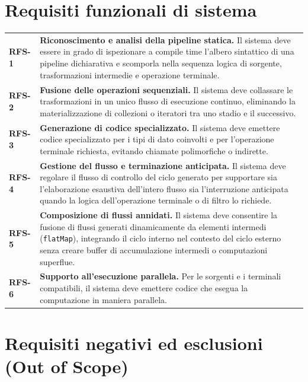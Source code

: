 \documentclass[a4paper,11pt]{report}
\theoremstyle{definition}
\begin{document}
\section{Requisiti funzionali di sistema}

\begin{longtable}{@{}p{}p{}@{}}
  \textbf{RFS-1} &
  \textbf{Riconoscimento e analisi della pipeline statica.}
  Il sistema deve essere in grado di ispezionare a compile time l'albero sintattico di una pipeline dichiarativa e scomporla nella sequenza logica di sorgente, trasformazioni intermedie e operazione terminale.
  \\[0.5em]

  \textbf{RFS-2} &
  \textbf{Fusione delle operazioni sequenziali.}
  Il sistema deve collassare le trasformazioni in un unico flusso di esecuzione continuo, eliminando la materializzazione di collezioni o iteratori tra uno stadio e il successivo.
  \\[0.5em]

  \textbf{RFS-3} &
  \textbf{Generazione di codice specializzato.}
  Il sistema deve emettere codice specializzato per i tipi di dato coinvolti e per l'operazione terminale richiesta, evitando chiamate polimorfiche o indirette.
  \\[0.5em]

  \textbf{RFS-4} &
  \textbf{Gestione del flusso e terminazione anticipata.}
  Il sistema deve regolare il flusso di controllo del ciclo generato per supportare sia l'elaborazione esaustiva dell'intero flusso sia l'interruzione anticipata quando la logica dell'operazione terminale o di filtro lo richiede.
  \\[0.5em]

  \textbf{RFS-5} &
  \textbf{Composizione di flussi annidati.}
  Il sistema deve consentire la fusione di flussi generati dinamicamente da elementi intermedi (\texttt{flatMap}), integrando il ciclo interno nel contesto del ciclo esterno senza creare buffer di accumulazione intermedi o computazioni superflue.
  \\[0.5em]

  \textbf{RFS-6} &
  \textbf{Supporto all'esecuzione parallela.}
  Per le sorgenti e i terminali compatibili, il sistema deve emettere codice che esegua la computazione in maniera parallela.
\end{longtable}

\section{Requisiti negativi ed esclusioni (Out of Scope)}
\end{document}
